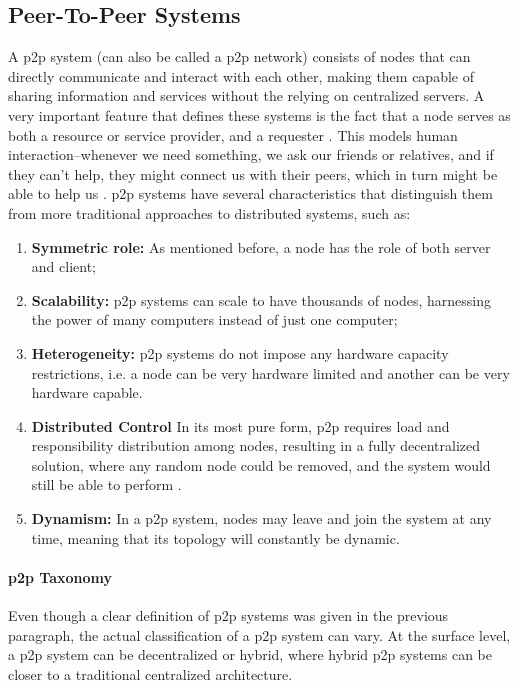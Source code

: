 \subsection{Peer-To-Peer Systems}
\label{ssec:p2p_systems}
\par A \gls{p2p} system (can also be called a \gls{p2p} network) consists of nodes that can directly communicate and interact with each other, making them capable of sharing information and services without the relying on centralized servers. A very important feature that defines these systems is the fact that a node serves as both a resource or service provider, and a requester \cite{Schollmeier2002}. This models human interaction--whenever we need something, we ask our friends or relatives, and if they can't help, they might connect us with their peers, which in turn might be able to help us \cite{Vu2010}. \gls{p2p} systems have several characteristics that distinguish them from more traditional approaches to distributed systems, such as:
\begin{enumerate}
\item \textbf{Symmetric role:} As mentioned before, a node has the role of both server and client;
\item \textbf{Scalability:} \Gls{p2p} systems can scale to have thousands of nodes, harnessing the power of many computers instead of just one computer;
\item \textbf{Heterogeneity:} \Gls{p2p} systems do not impose any hardware capacity restrictions, i.e. a node can be very hardware limited and another can be very hardware capable.
\item \textbf{Distributed Control} In its most pure form, \gls{p2p} requires load and responsibility distribution among nodes, resulting in a fully decentralized solution, where any random node could be removed, and the system would still be able to perform \cite{Schollmeier2002}.
\item \textbf{Dynamism:} In a \gls{p2p} system, nodes may leave and join the system at any time, meaning that its topology will constantly be dynamic.
\end{enumerate}
%
%
%
\paragraph{\Gls{p2p} Taxonomy} Even though a clear definition of \gls{p2p} systems was given in the previous paragraph, the actual classification of a \gls{p2p} system can vary. At the surface level, a \gls{p2p} system can be decentralized or hybrid, where hybrid \gls{p2p} systems can be closer to a traditional centralized architecture.
%
%
%
